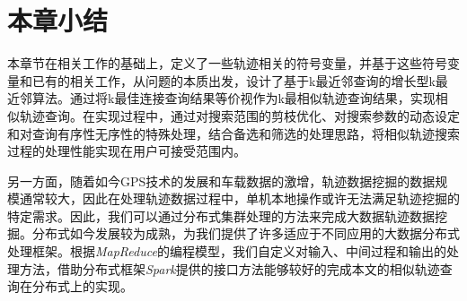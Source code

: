 
\section{本章小结}
\label{sec:implementation conclusion}
本章节在相关工作的基础上，定义了一些轨迹相关的符号变量，并基于这些符号变量和已有的相关工作，从问题的本质出发，设计了基于k最近邻查询的增长型k最近邻算法。通过将k最佳连接查询结果等价视作为k最相似轨迹查询结果，实现相似轨迹查询。在实现过程中，通过对搜索范围的剪枝优化、对搜索参数的动态设定和对查询有序性无序性的特殊处理，结合备选和筛选的处理思路，将相似轨迹搜索过程的处理性能实现在用户可接受范围内。

另一方面，随着如今GPS技术的发展和车载数据的激增，轨迹数据挖掘的数据规模通常较大，因此在处理轨迹数据过程中，单机本地操作或许无法满足轨迹挖掘的特定需求。因此，我们可以通过分布式集群处理的方法来完成大数据轨迹数据挖掘。分布式如今发展较为成熟，为我们提供了许多适应于不同应用的大数据分布式处理框架。根据\emph{MapReduce}的编程模型，我们自定义对输入、中间过程和输出的处理方法，借助分布式框架\emph{Spark}提供的接口方法能够较好的完成本文的相似轨迹查询在分布式上的实现。